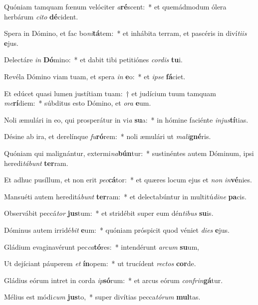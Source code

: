 \item Quóniam tamquam fœnum velóciter \textit{a}\textbf{ré}scent:~* et quemádmodum ólera herbárum \textit{ci}\textit{to} \textbf{dé}cident.
\item Spera in Dómino, et fac bo\textit{ni}\textbf{tá}tem:~* et inhábita terram, et pascéris in diví\textit{ti}\textit{is} \textbf{e}jus.
\item Delectáre \textit{in} \textbf{Dó}mino:~* et dabit tibi petitiónes \textit{cor}\textit{dis} \textbf{tu}i.
\item Revéla Dómino viam tuam, et spera \textit{in} \textbf{e}o:~* et \textit{ip}\textit{se} \textbf{fá}ciet.
\item Et edúcet quasi lumen justítiam tuam:~† et judícium tuum tamquam \textit{me}\textbf{rí}diem:~* súbditus esto Dómino, et \textit{o}\textit{ra} \textbf{e}um.
\item Noli æmulári in eo, qui prosperátur in vi\textit{a} \textbf{su}a:~* in hómine faciénte \textit{in}\textit{jus}\textbf{tí}tias.
\item Désine ab ira, et derelínque \textit{fu}\textbf{ró}rem:~* noli æmulári ut \textit{ma}\textit{li}\textbf{gné}ris.
\item Quóniam qui malignántur, extermi\textit{na}\textbf{bún}tur:~* sustinéntes autem Dóminum, ipsi heredi\textit{tá}\textit{bunt} \textbf{ter}ram.
\item Et adhuc pusíllum, et non erit \textit{pec}\textbf{cá}tor:~* et quæres locum ejus et \textit{non} \textit{in}\textbf{vé}nies.
\item Mansuéti autem hereditá\textit{bunt} \textbf{ter}ram:~* et delectabúntur in multitú\textit{di}\textit{ne} \textbf{pa}cis.
\item Observábit peccá\textit{tor} \textbf{jus}tum:~* et stridébit super eum dén\textit{ti}\textit{bus} \textbf{su}is.
\item Dóminus autem irridé\textit{bit} \textbf{e}um:~* quóniam próspicit quod véniet \textit{di}\textit{es} \textbf{e}jus.
\item Gládium evaginavérunt pec\textit{ca}\textbf{tó}res:~* intendérunt \textit{ar}\textit{cum} \textbf{su}um,
\item Ut dejíciant páuperem \textit{et} \textbf{ín}opem:~* ut trucídent \textit{rec}\textit{tos} \textbf{cor}de.
\item Gládius eórum intret in corda \textit{ip}\textbf{só}rum:~* et arcus eórum \textit{con}\textit{frin}\textbf{gá}tur.
\item Mélius est módi\textit{cum} \textbf{jus}to,~* super divítias pecca\textit{tó}\textit{rum} \textbf{mul}tas.

